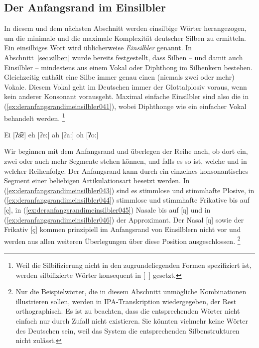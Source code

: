 \subsection{Der Anfangsrand im Einsilbler}
\label{sec:deranfangsrandimeinsilbler}

In diesem und dem nächsten Abschnitt werden einsilbige Wörter herangezogen, um die minimale und die maximale Komplexität deutscher Silben zu ermitteln.
Ein einsilbiges Wort wird üblicherweise \textit{Einsilbler} genannt.
In Abschnitt~\ref{sec:silben} wurde bereits festgestellt, dass Silben -- und damit auch Einsilbler -- mindestens aus einem Vokal oder Diphthong im Silbenkern bestehen.
Gleichzeitig enthält eine Silbe immer genau einen (niemals zwei oder mehr) Vokale.
Diesem Vokal geht im Deutschen immer der Glottalplosiv voraus, wenn kein anderer Konsonant vorausgeht.
Maximal einfache Einsilbler sind also die in (\ref{ex:deranfangsrandimeinsilbler041}), wobei Diphthonge wie ein einfacher Vokal behandelt werden.%
\footnote{Weil die Silbifizierung nicht in den zugrundeliegenden Formen spezifiziert ist, werden silbifizierte Wörter konsequent in [~] gesetzt.}

\begin{exe}
  \ex\label{ex:deranfangsrandimeinsilbler041}
  \begin{xlist}
    \ex Ei [ʔa͡ɛ]
    \ex eh [ʔeː]
    \ex ah [ʔaː]
    \ex oh [ʔoː]
  \end{xlist}
\end{exe}

Wir beginnen mit dem Anfangsrand und überlegen der Reihe nach, ob dort ein, zwei oder auch mehr Segmente stehen können, und falls es so ist, welche und in welcher Reihenfolge.
Der Anfangsrand kann durch ein einzelnes konsonantisches Segment einer beliebigen Artikulationsart besetzt werden.
In (\ref{ex:deranfangsrandimeinsilbler043}) sind es stimmlose und stimmhafte Plosive, in (\ref{ex:deranfangsrandimeinsilbler044}) stimmlose und stimmhafte Frikative bis auf [ç], in (\ref{ex:deranfangsrandimeinsilbler045}) Nasale bis auf [ŋ] und in (\ref{ex:deranfangsrandimeinsilbler046}) der Approximant.
Der Nasal [ŋ] sowie der Frikativ [ç] kommen prinzipiell im Anfangsrand von Einsilblern nicht vor und werden aus allen weiteren Überlegungen über diese Position ausgeschlossen.%
\footnote{Nur die Beispielwörter, die in diesem Abschnitt unmögliche Kombinationen illustrieren sollen, werden in IPA-Transkription wiedergegeben, der Rest orthographisch.
Es ist zu beachten, dass die entsprechenden Wörter nicht einfach nur durch Zufall nicht existieren.
Sie könnten vielmehr keine Wörter des Deutschen sein, weil das System die entsprechenden Silbenstrukturen nicht zulässt.}

